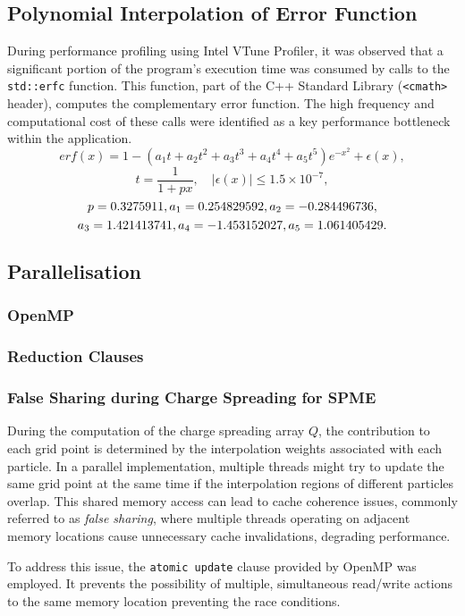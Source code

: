 \subsection*{Polynomial Interpolation of Error Function}
During performance profiling using Intel VTune Profiler, it was observed that a significant portion of the program’s execution time was consumed by calls to the \verb|std::erfc| function. This function, part of the C++ Standard Library (\verb|<cmath>| header), computes the complementary error function. The high frequency and computational cost of these calls were identified as a key performance bottleneck within the application.
\[
erf(x) = 1 - (a_1 t + a_2 t^2 + a_3 t^3 + a_4 t^4 + a_5 t^5) e^{-x^2} + \epsilon(x),
\]
\[
t = \frac{1}{1 + px}, \quad |\epsilon(x)| \leq 1.5 \times 10^{-7},
\]
\[
p = 0.3275911, \\
a_1 = 0.254829592, \\
a_2 = -0.284496736,
\]
\[
a_3 = 1.421413741, \\
a_4 = -1.453152027, \\
a_5 = 1.061405429.
\]
\subsection*{Parallelisation}

\subsubsection*{OpenMP}
\subsubsection*{Reduction Clauses}

\subsubsection*{False Sharing during Charge Spreading for SPME}
During the computation of the charge spreading array $Q$, the contribution to each grid point is determined by the interpolation weights associated with each particle. In a parallel implementation, multiple threads might try to update the same grid point at the same time if the interpolation regions of different particles overlap.  This shared memory access can lead to cache coherence issues, commonly referred to as \textit{false sharing}, where multiple threads operating on adjacent memory locations cause unnecessary cache invalidations, degrading performance. 

To address this issue, the \verb|atomic update| clause provided by OpenMP was employed. It prevents the possibility of multiple, simultaneous read/write actions to the same memory location preventing the race conditions. 